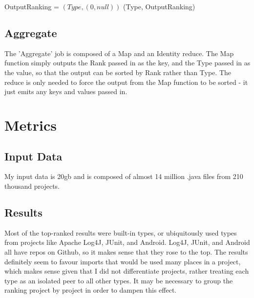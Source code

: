 \documentclass{article}
\begin{document}
\vspace{\baselineskip}

\begin{algorithm}[H]
 \SetAlgoLined

\vspace{\baselineskip}
 OutputRanking = $(Type,(0,null))$\;
 \Emit (Type, OutputRanking)\;
\end{algorithm}

\vspace{\baselineskip}


\subsection{Aggregate}

The 'Aggregate' job is composed of a Map and an Identity reduce. The Map function simply outputs the Rank passed in as the key, and the Type passed in as the value, so that the output can be sorted by Rank rather than Type. The reduce is only needed to force the output from the Map function to be sorted - it just emits any keys and values passed in.

\section{Metrics}

\subsection{Input Data}

My input data is 20gb and is composed of almost 14 million .java files from 210 thousand projects.

\subsection{Results}

Most of the top-ranked results were built-in types, or ubiquitously used types from projects like Apache Log4J, JUnit, and Android. Log4J, JUnit, and Android all have repos on Github, so it makes sense that they rose to the top. The results definitely seem to favour imports that would be used many places in a project, which makes sense given that I did not differentiate projects, rather treating each type as an isolated peer to all other types. It may be necessary to group the ranking project by project in order to dampen this effect. 
\end{document}
